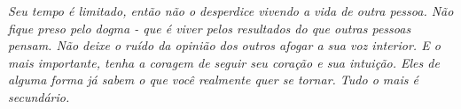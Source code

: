 \newpage

\vspace*{10cm}
\hspace{4cm}\begin{minipage}{.51\textwidth}

\textit{Seu tempo é limitado, então não o desperdice vivendo a vida de outra pessoa. Não fique preso pelo dogma - que é viver pelos resultados do que outras pessoas pensam. Não deixe o ruído da opinião dos outros afogar a sua voz interior. E o mais importante, tenha a coragem de seguir seu coração e sua intuição. Eles de alguma forma já sabem o que você realmente quer se tornar. Tudo o mais é secundário.\cite{Jobs}}


\end{minipage}
